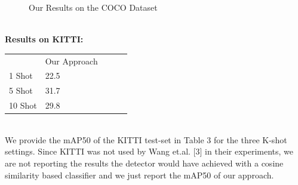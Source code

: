 \documentclass{article}
\begin{document}
\begin{figure}[h!]
\begin{minipage}{0.47\textwidth}
  \label{10 Shot}
  \end{minipage}
  \caption{Our Results on the COCO Dataset }
  \label{finetuning}
\end{figure}\\
\textbf{Results on KITTI:}\\
\begin{table}[h!]
\begin{tabular}{lllll}
        & Our Approach &  &  &  \\
1 Shot  & 22.5         &  &  &  \\
5 Shot  & 31.7         &  &  &  \\
10 Shot & 29.8         &  &  & 
\end{tabular}
\end{table}\\
We provide the mAP50 of the KITTI test-set in Table 3 for the three K-shot settings. Since KITTI was not used by Wang et.al. [3] in their experiments, we are not reporting the results the detector would have achieved with a cosine similarity based classifier and we just report the mAP50 of our approach. 
\end{document}
